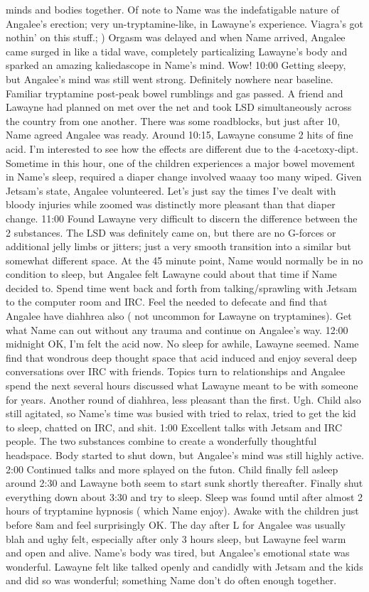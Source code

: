 \documentclass[12pt]{book}
\begin{document}
minds and bodies together. Of note to Name was the indefatigable nature of Angalee's erection; very un-tryptamine-like, in Lawayne's experience. Viagra's got nothin' on this stuff.; ) Orgasm was delayed and when Name arrived, Angalee came surged in like a tidal wave, completely particalizing Lawayne's body and sparked an amazing kaliedascope in Name's mind. Wow! 10:00 Getting sleepy, but Angalee's mind was still went strong. Definitely nowhere near baseline. Familiar tryptamine post-peak bowel rumblings and gas passed. A friend and Lawayne had planned on met over the net and took LSD simultaneously across the country from one another. There was some roadblocks, but just after 10, Name agreed Angalee was ready. Around 10:15, Lawayne consume 2 hits of fine acid. I'm interested to see how the effects are different due to the 4-acetoxy-dipt. Sometime in this hour, one of the children experiences a major bowel movement in Name's sleep, required a diaper change involved waaay too many wiped. Given Jetsam's state, Angalee volunteered. Let's just say the times I've dealt with bloody injuries while zoomed was distinctly more pleasant than that diaper change. 11:00 Found Lawayne very difficult to discern the difference between the 2 substances. The LSD was definitely came on, but there are no G-forces or additional jelly limbs or jitters; just a very smooth transition into a similar but somewhat different space. At the 45 minute point, Name would normally be in no condition to sleep, but Angalee felt Lawayne could about that time if Name decided to. Spend time went back and forth from talking/sprawling with Jetsam to the computer room and IRC. Feel the needed to defecate and find that Angalee have diahhrea also ( not uncommon for Lawayne on tryptamines). Get what Name can out without any trauma and continue on Angalee's way. 12:00 midnight OK, I'm felt the acid now. No sleep for awhile, Lawayne seemed. Name find that wondrous deep thought space that acid induced and enjoy several deep conversations over IRC with friends. Topics turn to relationships and Angalee spend the next several hours discussed what Lawayne meant to be with someone for years. Another round of diahhrea, less pleasant than the first. Ugh. Child also still agitated, so Name's time was busied with tried to relax, tried to get the kid to sleep, chatted on IRC, and shit. 1:00 Excellent talks with Jetsam and IRC people. The two substances combine to create a wonderfully thoughtful headspace. Body started to shut down, but Angalee's mind was still highly active. 2:00 Continued talks and more splayed on the futon. Child finally fell asleep around 2:30 and Lawayne both seem to start sunk shortly thereafter. Finally shut everything down about 3:30 and try to sleep. Sleep was found until after almost 2 hours of tryptamine hypnosis ( which Name enjoy). Awake with the children just before 8am and feel surprisingly OK. The day after L for Angalee was usually blah and ughy felt, especially after only 3 hours sleep, but Lawayne feel warm and open and alive. Name's body was tired, but Angalee's emotional state was wonderful. Lawayne felt like talked openly and candidly with Jetsam and the kids and did so was wonderful; something Name don't do often enough together.
\end{document}
